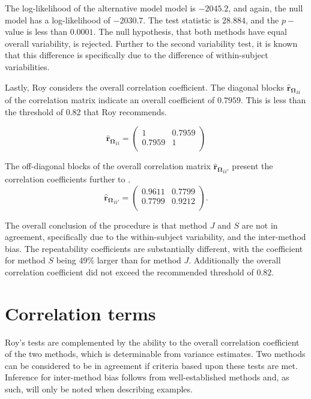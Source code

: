 \documentclass[12pt, a4paper]{report}
\theoremstyle{plain}
\theoremstyle{definition}
\theoremstyle{remark}
\begin{document}
	The log-likelihood of the alternative model model is $-2045.2$, and again, the null model has a log-likelihood of $-2030.7$. The test statistic is $28.884$, and the $p-$value is less than $0.0001$. The null hypothesis, that both methods have equal overall variability, is rejected. Further to the second variability test, it is known that this difference is specifically due to the difference of within-subject variabilities.
	
	Lastly, Roy considers the overall correlation coefficient. The diagonal blocks $\boldsymbol{\hat{r}_{\Omega}}_{ii}$ of the correlation matrix indicate an overall coefficient of $0.7959$. This is less than the threshold of 0.82 that Roy recommends.
	
	
	\begin{equation}
	\boldsymbol{\hat{r}_{\Omega}}_{ii} = \left( \begin{array}{cc}
	1  & 0.7959  \\
	0.7959  & 1  \\
	\end{array}\right)
	\end{equation}
	
	The off-diagonal blocks of the overall correlation matrix $\boldsymbol{\hat{r}_{\Omega}}_{ii'}$ present the correlation coefficients further to \citet{hamlett}.
	\[
	\boldsymbol{\hat{r}_{\Omega}}_{ii'} = \left( \begin{array}{cc}
	0.9611  & 0.7799  \\
	0.7799  & 0.9212  \\
	\end{array}\right).
	\]
	
	The overall conclusion of the procedure is that method $J$ and $S$ are not in agreement, specifically due to the within-subject variability, and the inter-method bias. The repeatability coefficients are substantially different, with the coefficient for method $S$ being 49\% larger than for method $J$. Additionally the overall correlation coefficient did not exceed the recommended threshold of $0.82$.
	
			
			
			
			
			
			\section{Correlation terms}
			
			Roy's tests are complemented by the ability to the overall correlation coefficient of the two methods, which is determinable from variance estimates. Two methods can be considered to be in agreement if criteria based upon these tests are met. Inference for inter-method bias follows from well-established methods and, as such, will only be noted when describing examples.
			
\end{document}
